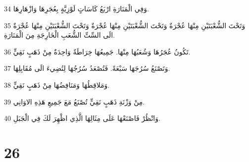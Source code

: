 \par 34 وَفِي الْمَنَارَةِ ارْبَعُ كَاسَاتٍ لَوْزِيَّةٍ بِعُجَرِهَا وَازْهَارِهَا.
\par 35 وَتَحْتَ الشُّعْبَتَيْنِ مِنْهَا عُجْرَةٌ وَتَحْتَ الشُّعْبَتَيْنِ مِنْهَا عُجْرَةٌ وَتَحْتَ الشُّعْبَتَيْنِ مِنْهَا عُجْرَةٌ الَى السِّتِّ الشُّعَبِ الْخَارِجَةِ مِنَ الْمَنَارَةِ.
\par 36 تَكُونُ عُجَرُهَا وَشُعَبُهَا مِنْهَا. جَمِيعُهَا خِرَاطَةٌ وَاحِدَةٌ مِنْ ذَهَبٍ نَقِيٍّ.
\par 37 وَتَصْنَعُ سُرُجَهَا سَبْعَةً. فَتُصْعَدُ سُرُجُهَا لِتُضِيءَ الَى مُقَابِلِهَا.
\par 38 وَمَلاقِطُهَا وَمَنَافِضُهَا مِنْ ذَهَبٍ نَقِيٍّ.
\par 39 مِنْ وَزْنَةِ ذَهَبٍ نَقِيٍّ تُصْنَعُ مَعَ جَمِيعِ هَذِهِ الاوَانِي.
\par 40 وَانْظُرْ فَاصْنَعْهَا عَلَى مِثَالِهَا الَّذِي اظْهِرَ لَكَ فِي الْجَبَلِ.

\chapter{26}

